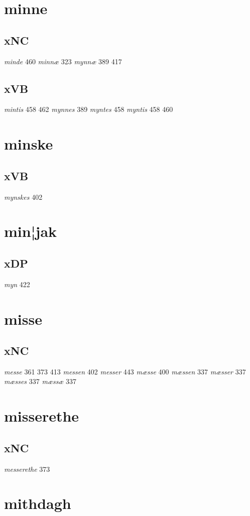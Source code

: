 \documentclass[a4paper,twocolumn]{article}
\begin{document}
\section{minne}
\label{sec:org3771139}
\subsection{xNC}
\label{sec:org435a64d}
\emph{minde} 460 \emph{minnæ} 323 \emph{mynnæ} 389 417 
\subsection{xVB}
\label{sec:org84af94a}
\emph{mintis} 458 462 \emph{mynnes} 389 \emph{myntes} 458 \emph{myntis} 458 460 
\section{minske}
\label{sec:org26a78b9}
\subsection{xVB}
\label{sec:org2b70fd6}
\emph{mynskes} 402 
\section{min¦jak}
\label{sec:orgb83bde0}
\subsection{xDP}
\label{sec:orgddef8b1}
\emph{myn} 422 
\section{misse}
\label{sec:org9283996}
\subsection{xNC}
\label{sec:org9c5ed3d}
\emph{messe} 361 373 413 \emph{messen} 402 \emph{messer} 443 \emph{mæsse} 400 \emph{mæssen} 337 \emph{mæsser} 337 \emph{mæsses} 337 \emph{mæssæ} 337 
\section{misserethe}
\label{sec:orgc5766df}
\subsection{xNC}
\label{sec:org499c453}
\emph{messerethe} 373 
\section{mithdagh}
\label{sec:org1275d2d}
\end{document}
